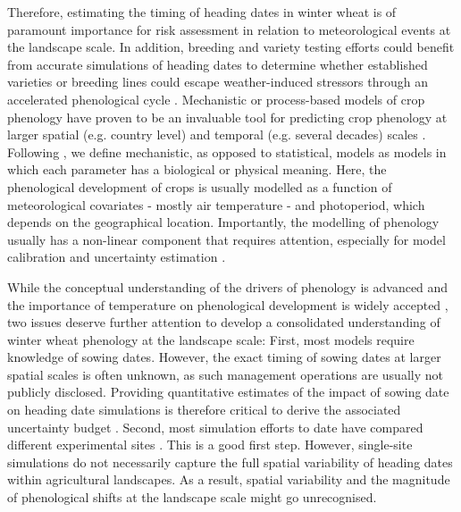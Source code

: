 Therefore, estimating the timing of heading dates in winter wheat is of paramount importance for risk assessment in relation to meteorological events at the landscape scale. In addition, breeding and variety testing efforts could benefit from accurate simulations of heading dates to determine whether established varieties or breeding lines could escape weather-induced stressors through an accelerated phenological cycle \citep{rogger_can_2021}. Mechanistic or process-based models of crop phenology have proven to be an invaluable tool for predicting crop phenology at larger spatial (e.g. country level) and temporal (e.g. several decades) scales \citep{mcmaster_simulating_1992, wu_comparison_2017, ceglar_improving_2019}. Following \cite{cox_towards_2006}, we define mechanistic, as opposed to statistical, models as models in which each parameter has a biological or physical meaning. Here, the phenological development of crops is usually modelled as a function of meteorological covariates - mostly air temperature - and photoperiod, which depends on the geographical location. Importantly, the modelling of phenology usually has a non-linear component that requires attention, especially for model calibration and uncertainty estimation \citep{kawakita_prediction_2020}.

While the conceptual understanding of the drivers of phenology is advanced \citep{hyles_phenology_2020} and the importance of temperature on phenological development is widely accepted \citep{porter_temperatures_1999}, two issues deserve further attention to develop a consolidated understanding of winter wheat phenology at the landscape scale: First, most models require knowledge of sowing dates. However, the exact timing of sowing dates at larger spatial scales is often unknown, as such management operations are usually not publicly disclosed. Providing quantitative estimates of the impact of sowing date on heading date simulations is therefore critical to derive the associated uncertainty budget \citep{wu_comparison_2017, dueri_simulation_2022}. Second, most simulation efforts to date have compared different experimental sites \citep[for example]{rogger_can_2021}. This is a good first step. However, single-site simulations do not necessarily capture the full spatial variability of heading dates within agricultural landscapes. As a result, spatial variability and the magnitude of phenological shifts at the landscape scale might go unrecognised.

